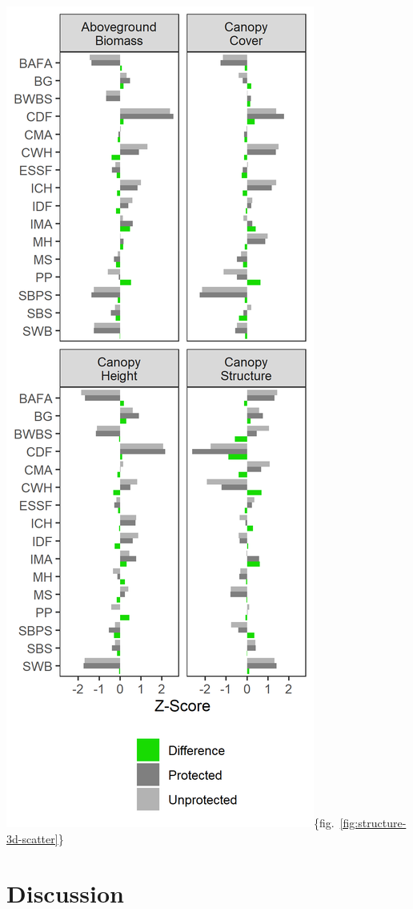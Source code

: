 \documentclass[11pt]{article}
\makeatletter
\def\maxwidth{\ifdim\Gin@nat@width>\linewidth\linewidth
\else\Gin@nat@width\fi}
\let\Oldincludegraphics\includegraphics
\renewcommand{\includegraphics}[1]{\Oldincludegraphics[width=\maxwidth]{#1}}
\makeatother
\begin{document}
\includegraphics{figures/fstruct_zscores.png}\{fig.~\ref{fig:structure-3d-scatter}\}

\hypertarget{discussion}{%
\section{Discussion}\label{discussion}}
\end{document}
